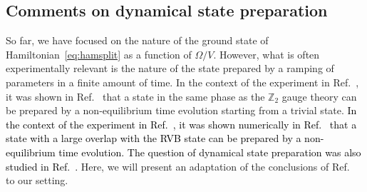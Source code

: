 \documentclass[twocolumn,superscriptaddress,amsmath,amssymb,aps,prx,nofootinbib]{revtex4-2}
\newcommand{\newtext}[1]{\textcolor{black}{#1}}
\begin{document}
\subsection{Comments on dynamical state preparation}\label{sec:dynamics}
So far, we have focused on the nature of the ground state of Hamiltonian~\eqref{eq:hamsplit} as a function of $\Omega/V$. However, what is often experimentally relevant is the nature of the state prepared by a ramping of parameters in a finite amount of time. In the context of the experiment in Ref.~\cite{semeghini2021}, it was shown in Ref.~\cite{giudici2022dynamical,sahay2022quantum} that a state in the same phase as the $\mathbb{Z}_2$ gauge theory can be prepared by a non-equilibrium time evolution starting from a trivial state.
\newtext{In the context of the experiment in Ref.~\cite{semeghini2021}, it was shown numerically in Ref.~\cite{giudici2022dynamical} that a state with a large overlap with the RVB state can be prepared by a non-equilibrium time evolution.
The question of dynamical state preparation was also studied in Ref.~\cite{sahay2022quantum}.}
Here, we will present an adaptation of the conclusions of Ref.~\cite{sahay2022quantum} to our setting. 
\end{document}
